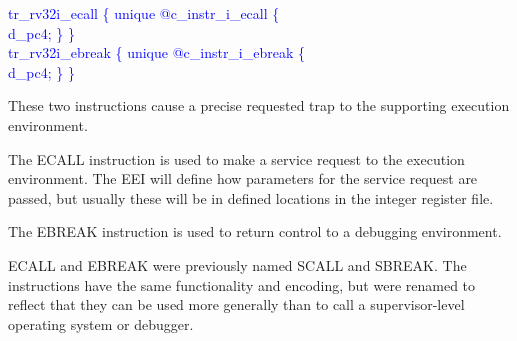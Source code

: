 \textcolor{blue}{
   tr\_rv32i\_ecall \{ unique @c\_instr\_i\_ecall \{ \\%
\indent \hspace{\parindent} d\_pc4; \} \} \\%
\indent tr\_rv32i\_ebreak \{ unique @c\_instr\_i\_ebreak \{ \\%
\indent \hspace{\parindent} d\_pc4; \} \} \\%
}

These two instructions cause a precise requested trap to the
supporting execution environment.

The ECALL instruction is used to make a service request to the
execution environment.  The EEI will define how parameters for the
service request are passed, but usually these will be in defined
locations in the integer register file.

The EBREAK instruction is used to return control to a debugging
environment.

\begin{commentary}
ECALL and EBREAK were previously named SCALL and SBREAK.  The
instructions have the same functionality and encoding, but were
renamed to reflect that they can be used more generally than to call a
supervisor-level operating system or debugger.
\end{commentary}

